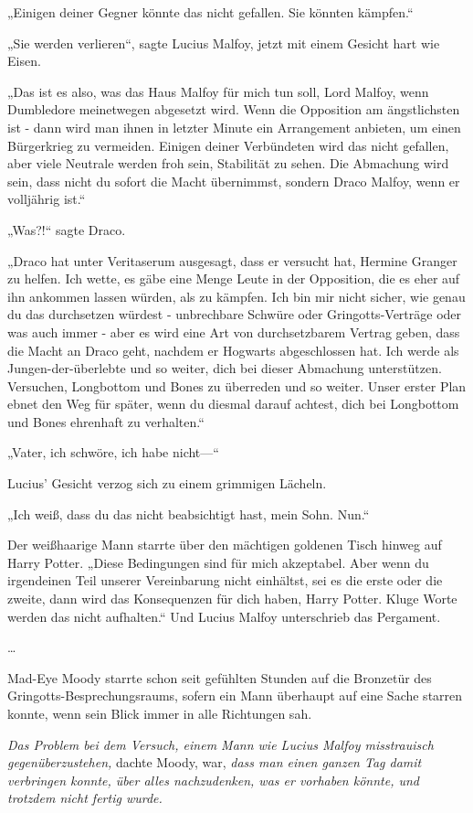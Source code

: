{„Einigen deiner Gegner könnte das nicht gefallen. Sie könnten kämpfen.“

„Sie werden verlieren“, sagte Lucius Malfoy, jetzt mit einem Gesicht hart wie Eisen.

„Das ist es also, was das Haus Malfoy für mich tun soll, Lord Malfoy, wenn Dumbledore meinetwegen abgesetzt wird. Wenn die Opposition am ängstlichsten ist - dann wird man ihnen in letzter Minute ein Arrangement anbieten, um einen Bürgerkrieg zu vermeiden. Einigen deiner Verbündeten wird das nicht gefallen, aber viele Neutrale werden froh sein, Stabilität zu sehen. Die Abmachung wird sein, dass nicht du sofort die Macht übernimmst, sondern Draco Malfoy, wenn er volljährig ist.“

„Was?!“ sagte Draco.

„Draco hat unter Veritaserum ausgesagt, dass er versucht hat, Hermine Granger zu helfen. Ich wette, es gäbe eine Menge Leute in der Opposition, die es eher auf ihn ankommen lassen würden, als zu kämpfen. Ich bin mir nicht sicher, wie genau du das durchsetzen würdest - unbrechbare Schwüre oder Gringotts-Verträge oder was auch immer - aber es wird eine Art von durchsetzbarem Vertrag geben, dass die Macht an Draco geht, nachdem er Hogwarts abgeschlossen hat. Ich werde als Jungen-der-überlebte und so weiter, dich bei dieser Abmachung unterstützen. Versuchen, Longbottom und Bones zu überreden und so weiter. Unser erster Plan ebnet den Weg für später, wenn du diesmal darauf achtest, dich bei Longbottom und Bones ehrenhaft zu verhalten.“

„Vater, ich schwöre, ich habe nicht—“

Lucius' Gesicht verzog sich zu einem grimmigen Lächeln.

„Ich weiß, dass du das nicht beabsichtigt hast, mein Sohn. Nun.“

Der weißhaarige Mann starrte über den mächtigen goldenen Tisch hinweg auf Harry Potter. „Diese Bedingungen sind für mich akzeptabel. Aber wenn du irgendeinen Teil unserer Vereinbarung nicht einhältst, sei es die erste oder die zweite, dann wird das Konsequenzen für dich haben, Harry Potter. Kluge Worte werden das nicht aufhalten.“ Und Lucius Malfoy unterschrieb das Pergament.

…

Mad-Eye Moody starrte schon seit gefühlten Stunden auf die Bronzetür des Gringotts-Besprechungsraums, sofern ein Mann überhaupt auf eine Sache starren konnte, wenn sein Blick immer in alle Richtungen sah.

\emph{Das Problem bei dem Versuch, einem Mann wie Lucius Malfoy misstrauisch gegenüberzustehen,} dachte Moody, war, \emph{dass man einen ganzen Tag damit verbringen konnte, über alles nachzudenken, was er vorhaben könnte, und trotzdem nicht fertig wurde.}

}
